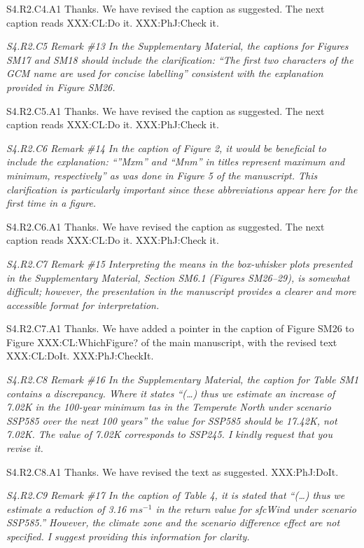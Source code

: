 \documentclass[a4paper,10pt]{article}
\begin{document}
	S4.R2.C4.A1 Thanks. We have revised the caption as suggested. The next caption reads XXX:CL:Do it. XXX:PhJ:Check it.

	\emph{S4.R2.C5 Remark \#13 In the Supplementary Material, the captions for Figures SM17 and SM18 should include the clarification: “The first two characters of the GCM name are used for concise labelling” consistent with the explanation provided in Figure SM26.}

	S4.R2.C5.A1 Thanks. We have revised the caption as suggested. The next caption reads XXX:CL:Do it. XXX:PhJ:Check it.

	\emph{S4.R2.C6 Remark \#14 In the caption of Figure 2, it would be beneficial to include the explanation: “”Mxm” and “Mnm” in titles represent maximum and minimum, respectively” as was done in Figure 5 of the manuscript. This clarification is particularly important since these abbreviations appear here for the first time in a figure.}

	S4.R2.C6.A1 Thanks. We have revised the caption as suggested. The next caption reads XXX:CL:Do it. XXX:PhJ:Check it.

	\emph{S4.R2.C7 Remark \#15 Interpreting the means in the box-whisker plots presented in the Supplementary Material, Section SM6.1 (Figures SM26–29), is somewhat difficult; however, the presentation in the manuscript provides a clearer and more accessible format for interpretation.}

	S4.R2.C7.A1 Thanks. We have added a pointer in the caption of Figure SM26 to Figure XXX:CL:WhichFigure? of the main manuscript, with the revised text XXX:CL:DoIt. XXX:PhJ:CheckIt.

	\emph{S4.R2.C8 Remark \#16 In the Supplementary Material, the caption for Table SM1 contains a discrepancy. Where it states “(…) thus we estimate an increase of 7.02K in the 100-year minimum tas in the Temperate North under scenario SSP585 over the next 100 years” the value for SSP585 should be 17.42K, not 7.02K. The value of 7.02K corresponds to SSP245. I kindly request that you revise it.}

	S4.R2.C8.A1 Thanks. We have revised the text as suggested. XXX:PhJ:DoIt.

	\emph{S4.R2.C9 Remark \#17 In the caption of Table 4, it is stated that “(…) thus we estimate a reduction of 3.16 $ms^{-1}$ in the return value for sfcWind under scenario SSP585.” However, the climate zone and the scenario difference effect are not specified. I suggest providing this information for clarity.}
\end{document}

